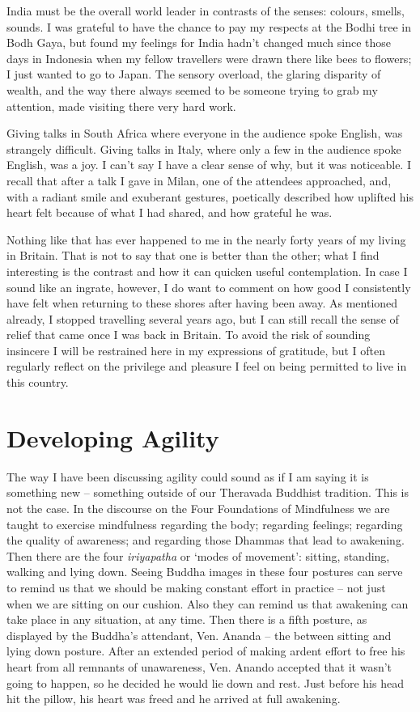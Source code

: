 India must be the overall world leader in contrasts of the senses:
colours, smells, sounds. I was grateful to have the chance to pay my
respects at the Bodhi tree in Bodh Gaya, but found my feelings for India
hadn't changed much since those days in Indonesia when my fellow
travellers were drawn there like bees to flowers; I just wanted
to go to Japan. The sensory overload, the glaring disparity of wealth,
and the way there always seemed to be someone trying to grab my
attention, made visiting there very hard work.

Giving talks in South Africa where everyone in the audience spoke
English, was strangely difficult. Giving talks in Italy, where only a
few in the audience spoke English, was a joy. I can't say I have a clear
sense of why, but it was noticeable. I recall that after a talk I gave
in Milan, one of the attendees approached, and, with a radiant smile and
exuberant gestures, poetically described how uplifted his heart felt
because of what I had shared, and how grateful he was.

Nothing like that has ever happened to me in the nearly forty years of
my living in Britain. That is not to say that one is better than the
other; what I find interesting is the contrast and how it can quicken
useful contemplation. In case I sound like an ingrate, however, I do
want to comment on how good I consistently have felt when returning to
these shores after having been away. As mentioned already, I stopped
travelling several years ago, but I can still recall the sense of relief
that came once I was back in Britain. To avoid the risk of sounding
insincere I will be restrained here in my expressions of gratitude, but
I often regularly reflect on the privilege and pleasure I feel on being
permitted to live in this country.

\section{Developing Agility}

The way I have been discussing agility could sound as if I am saying it
is something new -- something outside of our Theravada Buddhist
tradition. This is not the case. In the discourse on the Four
Foundations of Mindfulness we are taught to exercise mindfulness
regarding the body; regarding feelings; regarding the quality of
awareness; and regarding those Dhammas that lead to awakening. Then
there are the four \emph{iriyapatha} or `modes of movement': sitting,
standing, walking and lying down. Seeing Buddha images in these four
postures can serve to remind us that we should be making constant effort
in practice -- not just when we are sitting on our cushion. Also they
can remind us that awakening can take place in any situation, at any
time. Then there is a fifth posture, as displayed by the Buddha's
attendant, Ven. Ananda -- the between sitting and lying down posture.
After an extended period of making ardent effort to free his heart from
all remnants of unawareness, Ven. Anando accepted that it wasn't going
to happen, so he decided he would lie down and rest. Just before his
head hit the pillow, his heart was freed and he arrived at full
awakening.


